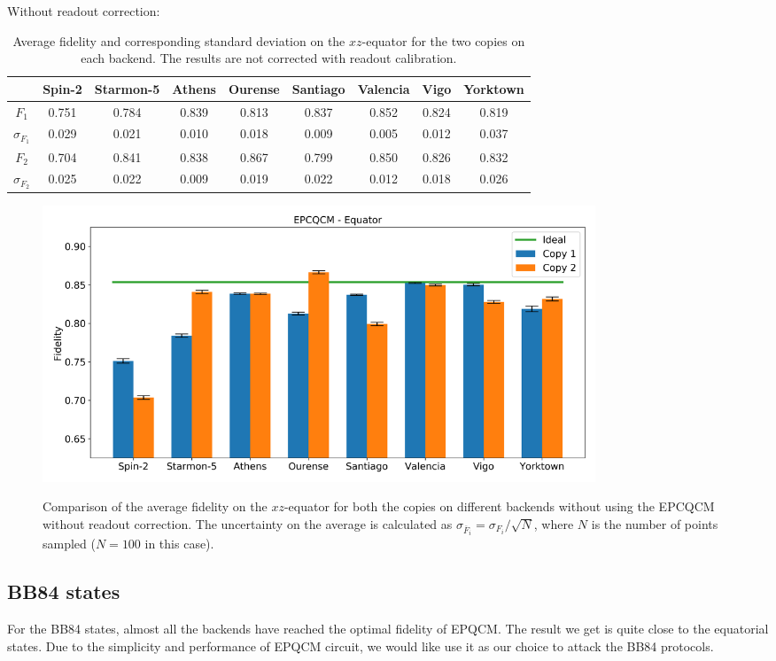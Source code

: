 Without readout correction:
\begin{table}[H]
    \centering
    \begin{tabular}{|c|c|c|c|c|c|c|c|c|}
    \hline
    \textbf{} & \textbf{Spin-2} & \textbf{Starmon-5} & \textbf{Athens} & \textbf{Ourense} & \textbf{Santiago} & \textbf{Valencia} & \textbf{Vigo} & \textbf{Yorktown} \\ \hline
    $F_1$              & 0.751  & 0.784 & 0.839 & 0.813 & 0.837 & 0.852 & 0.824 & 0.819 \\ \hline
    $\sigma_{F_1}$     & 0.029  & 0.021 & 0.010 & 0.018 & 0.009 & 0.005 & 0.012 & 0.037 \\ \hline
    $F_2$              & 0.704  & 0.841 & 0.838 & 0.867 & 0.799 & 0.850 & 0.826 & 0.832 \\ \hline
    $\sigma_{F_2}$     & 0.025  & 0.022 & 0.009 & 0.019 & 0.022 & 0.012 & 0.018 & 0.026 \\ \hline
    \end{tabular}
    \caption{Average fidelity and corresponding standard deviation on the $xz$-equator for the two copies on each backend. The results are not corrected with readout calibration.}
\end{table}
\begin{figure}[H]
  \centering
          \includegraphics[width=0.8\textwidth]{Figures/Economical/Histograms/histo_equator.png}
      \label{fig:epc_histo_equator_not_corrected}
      \caption{Comparison of the average fidelity on the $xz$-equator for both the copies on different backends without using the EPCQCM without readout correction. The uncertainty on the average is calculated as $\sigma_{\overline{F}_i}=\sigma_{F_i}/\sqrt{N}$, where $N$ is the number of points sampled ($N=100$ in this case).}
\end{figure}

\subsection{BB84 states}
For the BB84 states, almost all the backends have reached the optimal fidelity of EPQCM. The result we get is quite close to the equatorial states. Due to the simplicity and performance of EPQCM circuit, we would like use it as our choice to attack the BB84 protocols. 

